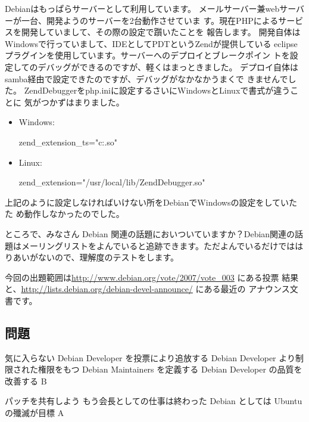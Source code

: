 \documentclass[mingoth,a4paper]{jsarticle}
\begin{document}
Debianはもっぱらサーバーとして利用しています。
メールサーバー兼webサーバーが一台、開発ようのサーバーを2台動作させていま
す。現在PHPによるサービスを開発していまして、その際の設定で躓いたことを
報告します。
開発自体はWindowsで行っていまして、IDEとしてPDTというZendが提供している
eclipseプラグインを使用しています。サーバーへのデプロイとブレークポイン
トを設定してのデバッグができるのですが、軽くはまっときました。
デプロイ自体はsamba経由で設定できたのですが、デバッグがなかなかうまくで
きませんでした。
ZendDebuggerをphp.iniに設定するさいにWindowsとLinuxで書式が違うことに
気がつかずはまりました。

\begin{itemize}
 \item Windows:
\begin{commandline}
zend_extension_ts="c:\php\ZendDebugger.so"
\end{commandline} 
\item Linux:
\begin{commandline}
zend_extension="/usr/local/lib/ZendDebugger.so"
\end{commandline}
\end{itemize}

上記のように設定しなければいけない所をDebianでWindowsの設定をしていたた
め動作しなかったのでした。





ところで、みなさん Debian 関連の話題においついていますか？Debian関連の話
題はメーリングリストをよんでいると追跡できます。ただよんでいるだけではは
りあいがないので、理解度のテストをします。

今回の出題範囲は\url{http://www.debian.org/vote/2007/vote_003} にある投票
結果と、\url{http://lists.debian.org/debian-devel-announce/} にある最近の
アナウンス文書です。

\subsection{問題}

{気に入らない Debian Developer を投票により追放する}
{Debian Developer より制限された権限をもつ Debian Maintainers を定義する}
{Debian Developer の品質を改善する}
{B}

{パッチを共有しよう}
{もう会長としての仕事は終わった}
{Debian としては Ubuntu の殲滅が目標}
{A}
\end{document}
